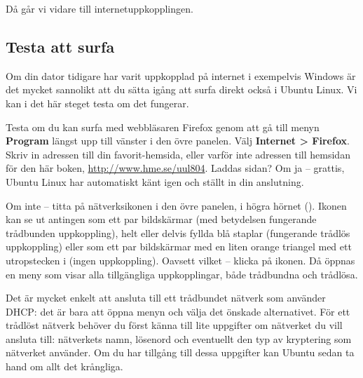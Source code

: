 \documentclass[a4paper,final]{memoir} %
\newcommand\xshortname{uul804}
\newcommand\xurl{http://www.hme.se/}
\begin{document}


Då går vi vidare till internetuppkopplingen. 

\subsection{Testa att surfa}\label{networkmanager}


Om din dator tidigare har varit uppkopplad på internet i exempelvis Windows är det mycket sannolikt att du sätta igång att surfa direkt också i Ubuntu Linux. Vi kan i det här steget testa om det fungerar. 

Testa om du kan surfa med webbläsaren Firefox genom att gå till menyn \textbf{Program} längst upp till vänster i den övre panelen. Välj \textbf{Internet \textgreater{} Firefox}. Skriv in adressen till din favorit-hemsida, eller varför inte adressen till hemsidan för den här boken, \url{\xurl\xshortname}. Laddas sidan? Om ja -- grattis, Ubuntu Linux har automatiskt känt igen och ställt in din anslutning. 


Om inte -- titta på nätverksikonen i den övre panelen, i högra hörnet (). Ikonen kan se ut antingen som ett par bildskärmar (med betydelsen fungerande trådbunden uppkoppling), helt eller delvis fyllda blå staplar (fungerande trådlös uppkoppling) eller som ett par bildskärmar med en liten orange triangel med ett utropstecken i (ingen uppkoppling). Oavsett vilket -- klicka på ikonen. Då öppnas en meny som visar alla tillgängliga uppkopplingar, både trådbundna och trådlösa. 

Det är mycket enkelt att ansluta till ett trådbundet nätverk som använder DHCP: det är bara att öppna menyn och välja det önskade alternativet. För ett trådlöst nätverk behöver du först känna till lite uppgifter om nätverket du vill ansluta till: nätverkets namn, lösenord och eventuellt den typ av kryptering som nätverket använder. Om du har tillgång till dessa uppgifter kan Ubuntu sedan ta hand om allt det krångliga.

\end{document}
